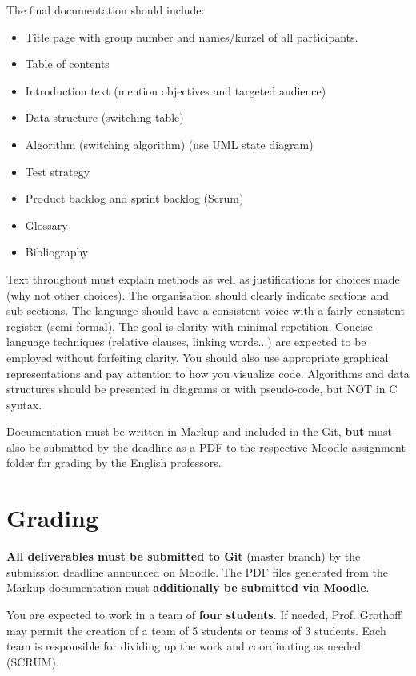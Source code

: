 \documentclass{article}
\begin{document}
The final documentation should include:
  \begin{itemize}
  \item Title page with group number and names/kurzel of all participants.
  \item Table of contents
  \item Introduction text (mention objectives and targeted audience)
  \item Data structure (switching table)
  \item Algorithm (switching algorithm) (use UML state diagram)
  \item Test strategy
  \item Product backlog and sprint backlog (Scrum)
  \item Glossary
  \item Bibliography
\end{itemize}

Text throughout must explain methods as well as justifications for
choices made (why not other choices). The organisation should clearly
indicate sections and sub-sections.  The language should have a
consistent voice with a fairly consistent register (semi-formal).  The
goal is clarity with minimal repetition.  Concise language techniques
(relative clauses, linking words...) are expected to be employed
without forfeiting clarity.  You should also use appropriate graphical
representations and pay attention to how you visualize code.
Algorithms and data structures should be presented in diagrams or with
pseudo-code, but NOT in C syntax.

Documentation must be written in Markup and included in the Git, {\bf
  but} must also be submitted by the deadline as a PDF to the
respective Moodle assignment folder for grading by the English
professors.


\section{Grading}

{\bf All deliverables must be submitted to Git} (master branch) by the
submission deadline announced on Moodle. The PDF files generated from
the Markup documentation must {\bf additionally be submitted via Moodle}.

You are expected to work in a team of {\bf four students}.  If needed,
Prof. Grothoff may permit the creation of a team of 5 students or
teams of 3 students.  Each team is responsible for dividing up the
work and coordinating as needed (SCRUM).
\end{document}
